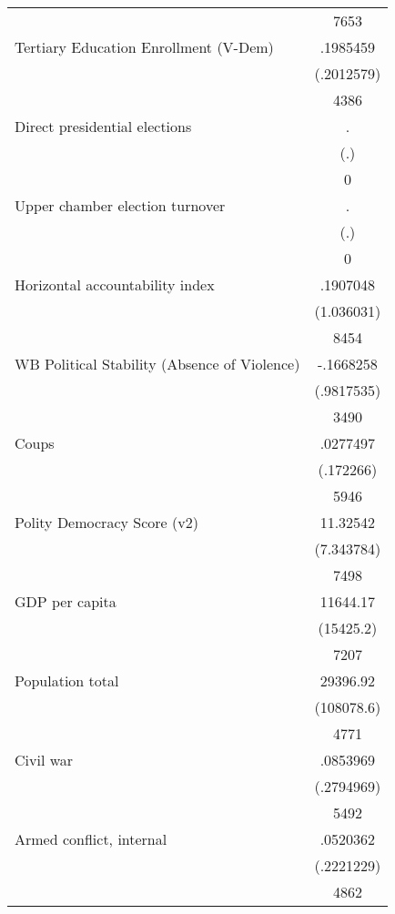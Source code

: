 {\begin{tabular}{l*{1}{c}}
                    &        7653\\
Tertiary Education Enrollment (V-Dem)&    .1985459\\
                    &  (.2012579)\\
                    &        4386\\
Direct presidential elections&           .\\
                    &         (.)\\
                    &           0\\
Upper chamber election turnover&           .\\
                    &         (.)\\
                    &           0\\
Horizontal accountability index&    .1907048\\
                    &  (1.036031)\\
                    &        8454\\
WB Political Stability (Absence of Violence)&   -.1668258\\
                    &  (.9817535)\\
                    &        3490\\
Coups               &    .0277497\\
                    &   (.172266)\\
                    &        5946\\
Polity Democracy Score (v2)&    11.32542\\
                    &  (7.343784)\\
                    &        7498\\
GDP per capita      &    11644.17\\
                    &   (15425.2)\\
                    &        7207\\
Population total    &    29396.92\\
                    &  (108078.6)\\
                    &        4771\\
Civil war           &    .0853969\\
                    &  (.2794969)\\
                    &        5492\\
Armed conflict, internal&    .0520362\\
                    &  (.2221229)\\
                    &        4862\\

\end{tabular}}

